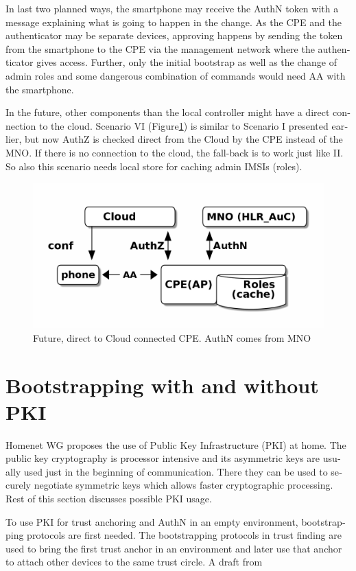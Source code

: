 \documentclass[12pt,a4paper,english]{tutthesis}
\begin{document}
\begin{otherlanguage}{english}
In last two planned ways, the smartphone may receive the AuthN token
with a message explaining what is going to happen in the change.  As
the CPE and the authenticator may be separate devices, approving
happens by sending the token from the smartphone to the CPE via the
management network where the authenticator gives access.  Further,
only the initial bootstrap as well as the change of admin roles and
some dangerous combination of commands would need AA with the
smartphone.


\label{scenario-iv} 
In the future, other components than  the  local controller might 
have a direct connection to the cloud. 
Scenario VI (Figure\ref{fig:scenario-VI}) is similar to Scenario I presented
earlier, but now AuthZ is checked direct from the Cloud by the CPE instead of
the MNO.  If there is no connection to the cloud, the fall-back is to work
just like II. So also this scenario needs local store for caching
admin IMSIs (roles).

\begin{figure}[htb]
\centering
\includegraphics[width=.9\linewidth]{scenVI.png}
\caption{\label{fig:scenario-VI}Future, direct to Cloud connected CPE. AuthN comes from MNO}
\end{figure}


\section{Bootstrapping with and without PKI}
\label{sec-6-7}
\label{bootstrapping}


Homenet WG proposes the use of Public Key Infrastructure (PKI) at 
home. The public key cryptography is processor intensive and its
asymmetric keys are usually used just in the beginning of
communication. There they can be used to securely negotiate symmetric
keys which allows faster cryptographic processing.
Rest of this section discusses possible PKI usage.

To use PKI for trust anchoring and AuthN in an empty environment,
bootstrapping protocols are first needed.  The bootstrapping protocols
in trust finding are used to bring the first trust anchor in an
environment and later use that anchor to attach other devices to the
same trust circle.  A draft from


\end{otherlanguage}
\end{document}
